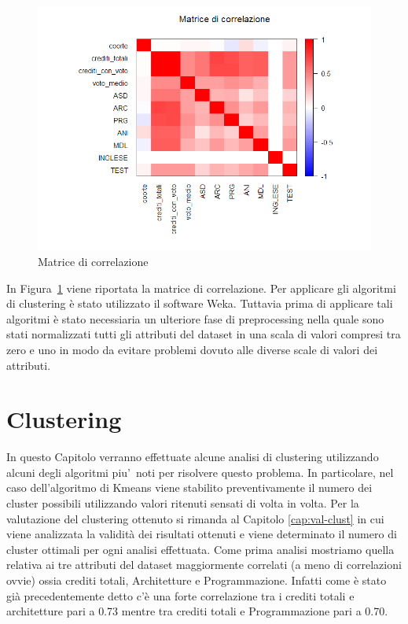 \documentclass[12pt]{article}
\begin{document}
\begin{figure}[H]
	\includegraphics[width=\textwidth]{img/corMatrix.png}
	\caption{Matrice di correlazione}
	\label{fig:cMatrix}
\end{figure}

In Figura~\ref{fig:cMatrix} viene riportata la matrice di correlazione.
Per applicare gli algoritmi di clustering è stato utilizzato il software Weka. Tuttavia prima di applicare tali algoritmi è stato necessiaria un ulteriore fase di preprocessing
nella quale sono stati normalizzati tutti gli attributi del dataset in una scala di valori compresi tra zero e uno in modo da evitare problemi dovuto alle diverse scale di valori dei attributi.


\section{Clustering}
\label{cap:clust}
In questo Capitolo verranno effettuate alcune analisi di clustering utilizzando alcuni degli algoritmi piu'\ noti per risolvere questo problema. In particolare, nel caso dell'algoritmo di Kmeans viene stabilito preventivamente il numero dei cluster possibili utilizzando valori ritenuti sensati di volta in volta. Per la valutazione del clustering ottenuto si rimanda al Capitolo \ref{cap:val-clust} in cui viene analizzata la validità dei risultati ottenuti e viene determinato il numero di cluster ottimali per ogni analisi effettuata.
Come prima analisi mostriamo quella relativa ai tre attributi del dataset maggiormente correlati (a meno di correlazioni ovvie) ossia crediti totali, Architetture e Programmazione.
Infatti come è stato già precedentemente detto c'è una forte correlazione tra i crediti totali e architetture pari a 0.73 mentre tra crediti totali e Programmazione pari a 0.70.
\end{document}
